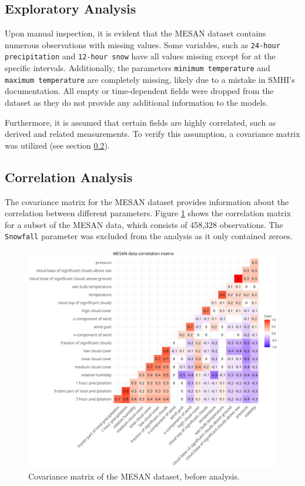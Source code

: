 \subsection{Exploratory Analysis}

Upon manual inspection, it is evident that the MESAN dataset contains numerous observations with missing values. Some variables, such as \texttt{24-hour precipitation} and \texttt{12-hour snow} have all values missing except for at the specific intervals. Additionally, the parameters \texttt{minimum temperature} and \texttt{maximum temperature} are completely missing, likely due to a mistake in SMHI's documentation. All empty or time-dependent fields were dropped from the dataset as they do not provide any additional information to the models. 

Furthermore, it is assumed that certain fields are highly correlated, such as derived and related measurements. To verify this assumption, a covariance matrix was utilized (see section \ref{sec:analysis-mesan-correlation}).

\subsection{Correlation Analysis}
\label{sec:analysis-mesan-correlation}

The covariance matrix for the MESAN dataset provides information about the correlation between different parameters. Figure \ref{fig:mesan-covariance-matrix-before-analysis} shows the correlation matrix for a subset of the MESAN data, which consists of 458,328 observations. The \texttt{Snowfall} parameter was excluded from the analysis as it only contained zeroes. 

\begin{figure}[H]
	\centering
	\includegraphics[width=\textwidth, keepaspectratio]{figures/mesan-covariance-matrix-before-analysis}
	\caption{Covariance matrix of the MESAN dataset, before analysis.}
	\label{fig:mesan-covariance-matrix-before-analysis}
\end{figure}

